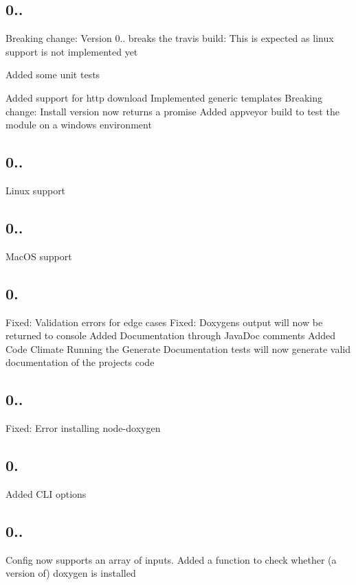 \subsection*{0..}

Breaking change\+: Version 0.. breaks the travis build\+: This is expected as linux support is not implemented yet

Added some unit tests

Added support for http download Implemented generic templates Breaking change\+: Install version now returns a promise Added appveyor build to test the module on a windows environment

\subsection*{0..}

Linux support

\subsection*{0..}

Mac\+OS support

\subsection*{0.}

Fixed\+: Validation errors for edge cases Fixed\+: Doxygen\textquotesingle{}s output will now be returned to console Added Documentation through Java\+Doc comments Added Code Climate Running the Generate Documentation tests will now generate valid documentation of the project\textquotesingle{}s code

\subsection*{0..}

Fixed\+: Error installing node-\/doxygen

\subsection*{0.}

Added C\+LI options

\subsection*{0..}

Config now supports an array of inputs. Added a function to check whether (a version of) doxygen is installed 